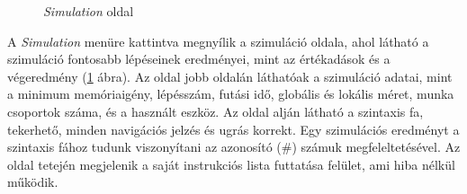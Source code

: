 \begin{figure}[h]
\centering
{}
\caption{\textit{Simulation} oldal}
\label{fig:sim}
\end{figure}


A \textit{Simulation} menüre kattintva megnyílik a szimuláció oldala, ahol látható a szimuláció fontosabb lépéseinek eredményei, mint az értékadások és a végeredmény (\ref{fig:sim} ábra). Az oldal jobb oldalán láthatóak a szimuláció adatai, mint a minimum memóriaigény, lépésszám, futási idő, globális és lokális méret, munka csoportok száma, és a használt eszköz. Az oldal alján látható a szintaxis fa, tekerhető, minden navigációs jelzés és ugrás korrekt. Egy szimulációs eredményt a szintaxis fához tudunk viszonyítani az azonosító (\#) számuk megfeleltetésével.
Az oldal tetején megjelenik a saját instrukciós lista futtatása felület, ami hiba nélkül működik.